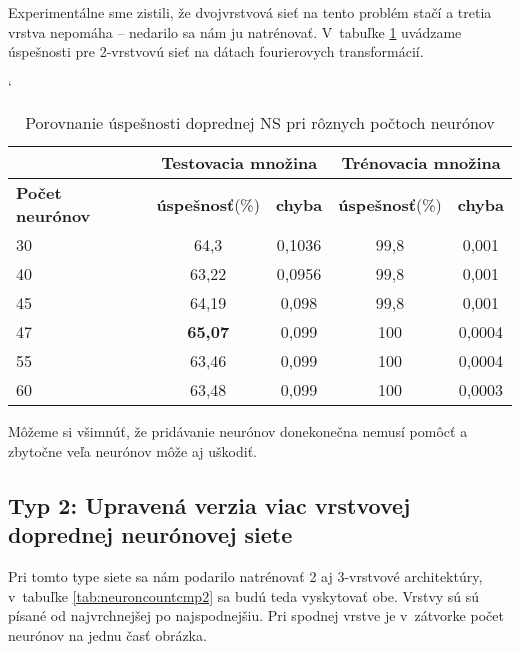 Experimentálne sme zistili, že dvojvrstvová sieť na tento problém stačí a tretia vrstva nepomáha -- nedarilo sa nám ju natrénovať. V~tabuľke \ref{tab:neuroncountcmp} uvádzame úspešnosti pre 2-vrstvovú sieť na dátach fourierovych transformácií.

\begin{table}[htp]
\catcode` %
\centering
\begin{tabular}{|l|c|c|c|c|}
\cline{2-5}
\multicolumn{1}{l}{} & \multicolumn{2}{|c|}{\textbf{Testovacia množina}} & \multicolumn{2}{c|}{\textbf{Trénovacia množina}}\\ 
\hline
\textbf{Počet neurónov} & \textbf{úspešnosť}(\%) & \textbf{chyba} & \textbf{úspešnosť}(\%) & \textbf{chyba} \\ \hline
30 & 64,3 & 0,1036 & 99,8 & 0,001 \\ \hline
40 & 63,22 & 0,0956 & 99,8 & 0,001 \\ \hline
45 & 64,19 & 0,098 & 99,8 & 0,001 \\ \hline
47 & \textbf{65,07} & 0,099 & 100 & 0,0004 \\ \hline
55 & 63,46 & 0,099 & 100 & 0,0004 \\ \hline
60 & 63,48 & 0,099 & 100 & 0,0003 \\ 
\hline
\end{tabular}
\caption{Porovnanie úspešnosti doprednej NS pri rôznych počtoch neurónov}
\label{tab:neuroncountcmp}
\end{table}

Môžeme si všimnúť, že pridávanie neurónov donekonečna nemusí pomôcť a zbytočne veľa neurónov môže aj uškodiť.

\subsection{Typ 2: Upravená verzia viac vrstvovej doprednej neurónovej siete}

Pri tomto type siete sa nám podarilo natrénovať 2 aj 3-vrstvové architektúry, v~tabuľke \ref{tab:neuroncountcmp2} sa budú teda vyskytovať obe. Vrstvy sú sú písané od najvrchnejšej po najspodnejšiu. Pri spodnej vrstve je v~zátvorke počet neurónov na jednu časť obrázka.

